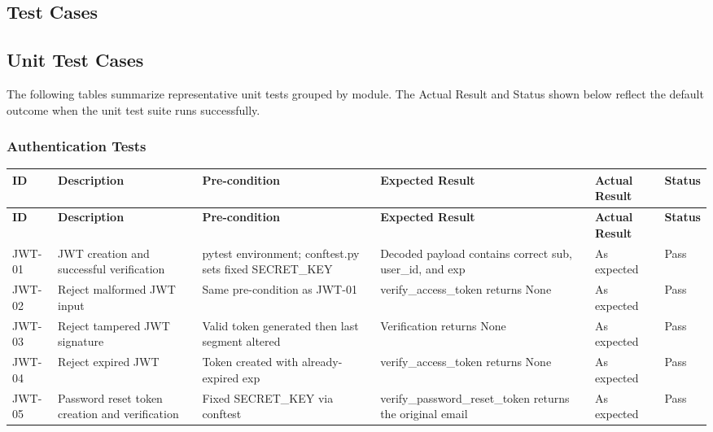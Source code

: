 \begin{appendices}
\chapter{Test Cases}
\label{appendix:testing}


\section{Unit Test Cases}
\label{appendix:unit_testing}
The following tables summarize representative unit tests grouped by module. The Actual Result and Status shown below reflect the default outcome when the unit test suite runs successfully.

{\small
\renewcommand{\arraystretch}{1.2}
\setlength{\tabcolsep}{4pt}

\subsection*{Authentication Tests}
\begin{longtable}{|p{1.2cm}|p{3.0cm}|p{2.8cm}|p{3.2cm}|p{2.2cm}|p{1.1cm}|}
\hline
\textbf{ID} & \textbf{Description} & \textbf{Pre-condition} & \textbf{Expected Result} & \textbf{Actual Result} & \textbf{Status} \\
\hline
\endfirsthead
\hline
\textbf{ID} & \textbf{Description} & \textbf{Pre-condition} & \textbf{Expected Result} & \textbf{Actual Result} & \textbf{Status} \\
\hline
\endhead
\hline
\endfoot

JWT-01 &
JWT creation and successful verification &
pytest environment; conftest.py sets fixed SECRET\_KEY &
Decoded payload contains correct sub, user\_id, and exp &
As expected &
Pass \\
\hline

JWT-02 &
Reject malformed JWT input &
Same pre-condition as JWT-01 &
verify\_access\_token returns None &
As expected &
Pass \\
\hline

JWT-03 &
Reject tampered JWT signature &
Valid token generated then last segment altered &
Verification returns None &
As expected &
Pass \\
\hline

JWT-04 &
Reject expired JWT &
Token created with already-expired exp &
verify\_access\_token returns None &
As expected &
Pass \\
\hline

JWT-05 &
Password reset token creation and verification &
Fixed SECRET\_KEY via conftest &
verify\_password\_reset\_token returns the original email &
As expected &
Pass \\
\hline


\end{longtable}}
\end{appendices}
